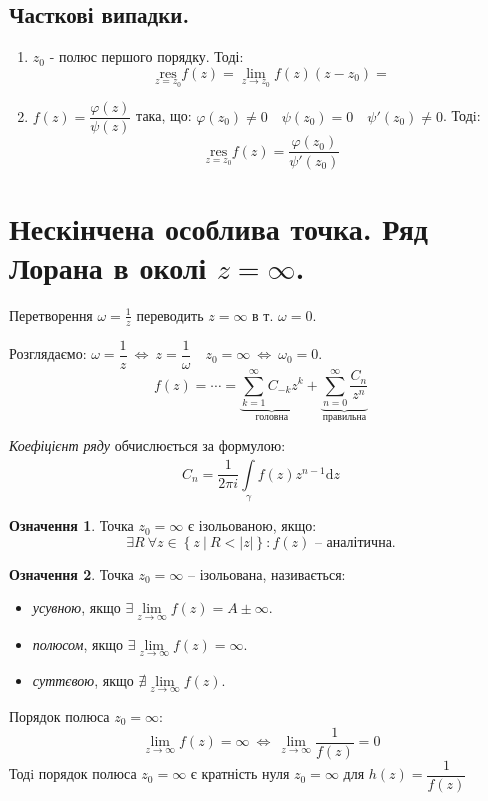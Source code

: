 \documentclass[a4paper]{scrartcl}
\theoremstyle{definition}
\newtheorem*{defo}{Означення}
\theoremstyle{remark}
\theoremstyle{definition}
\theoremstyle{definition}
\def\bdash{\ \Big|\  }         %
\def\res#1{\underset{#1}{\mathrm{res}}}
\begin{document}
\subsection{Часткові випадки.}
\begin{enumerate}
  \item $z_0$ - полюс першого порядку. Тоді:
  $$
  \res{z =  z_0} f(z) =  \lim\limits_{z\to  z_0}{ f(z) (z- z_0)} =
  $$
  \item $f(z) = \dfrac{\varphi(z)}{\psi(z)} $ така, що:
  $
  \varphi(z_0)  \neq  0 \quad \psi(z_0) = 0 \quad \psi'(z_0) \neq 0
  $.
  Тодi: $$ \res{z = z_0} f(z) = \frac{\varphi(z_0)}{
  \psi'(z_0)
  } $$
\end{enumerate}
\section{Нескінчена особлива точка. Ряд Лорана в околі $z = \infty$.}
Перетворення $\omega = \frac{1}{z} $ переводить $z = \infty$ в т. $\omega = 0$.\par
Розглядаємо: $ \omega  = \dfrac{1 }{z}   \ \Longleftrightarrow \ z = \dfrac{1}{\omega}   \quad
z_0 = \infty   \ \Longleftrightarrow \ \omega_0 = 0
  $.
  $$
  f(z) =  \cdots =  \underbrace{\sum\limits_{k = 1}^{ \infty}{C_{-k} z^k}}_{\text{головна}} + \underbrace{\sum\limits_{n = 0}^{ \infty}{ \frac{C_{n}}{z^n} }}_{\text{правильна}}
  $$

\textit{Коефіцієнт ряду} обчислюється за формулою:
$$
C_n = \frac{1}{ 2 \pi i}  \int\limits_{\gamma}^{}{f(z) z^{n-1}\mathrm{d} z}
$$

\begin{defo}
 Точка $z_0 = \infty $ є ізольованою, якщо:
 $$
 \exists R \ \forall z \in \left\lbrace  z  \bdash R < \left| z \right| \right\rbrace : f(z)  \text{ -- аналітична.}
 $$
\end{defo}
\newpage
\begin{defo}
 Точка $z_0 = \infty $ -- ізольована, називається:
 \begin{itemize}
   \item \textit{усувною}, якщо $ \exists  \lim\limits_{z\to  \infty}{f(z)} = A \pm \infty$.
   \item \textit{полюсом}, якщо $ \exists  \lim\limits_{z\to  \infty}{f(z)} = \infty$.
   \item \textit{суттєвою}, якщо $ \nexists  \lim\limits_{z\to  \infty}{f(z)}$.
 \end{itemize}
\end{defo}
Порядок полюса $z_0 = \infty$:
$$
 \lim\limits_{z\to  \infty}{ f(z)} = \infty \ \Longleftrightarrow \   \lim\limits_{z\to  \infty}{ \frac{1}{f(z)} } = 0
$$
Тодi порядок полюса  $z_0 = \infty$ є кратність нуля $z_0 = \infty$ для $h(z) = \dfrac{1}{f(z)} $
\end{document}
